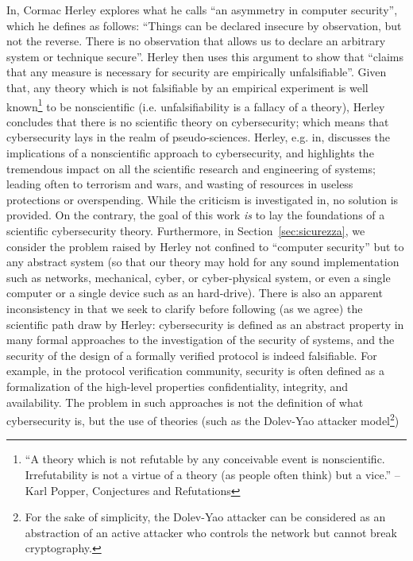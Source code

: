 \documentclass{article}
\theoremstyle{definition}
\theoremstyle{corollary}
\theoremstyle{lemma}
\theoremstyle{theorem}
\theoremstyle{theorem}
\begin{document}
In\autocite{Herley2016unfalsifiability}, Cormac Herley explores what he calls
``an asymmetry in computer security'', which he defines as follows: ``Things
can be declared insecure by observation, but not the reverse. There is no
observation that allows us to declare an arbitrary system or technique
secure''. Herley then uses this argument to show that ``claims that any measure
is necessary for security are empirically unfalsifiable''. Given that, any
theory which is not falsifiable by an empirical experiment is well
known\footnote{``A theory which is not refutable by any conceivable event is
nonscientific. Irrefutability is not a virtue of a theory (as people often
think) but a vice.'' -- Karl Popper, Conjectures and
Refutations\autocite{popper1962conjectures}} to be nonscientific (i.e.
unfalsifiability is a fallacy of a theory), Herley concludes that there is no
scientific theory on cybersecurity; which means that cybersecurity lays in the
realm of pseudo-sciences\autocite{Herley2016usenixvideo}.  Herley, e.g.
in\autocite{Herley2017justifying}, discusses the implications of a
nonscientific approach to cybersecurity, and highlights the tremendous impact on
all the scientific research and engineering of systems; leading often to
terrorism and wars, and wasting of resources in useless protections or
overspending.  While the criticism is investigated
in\autocite{Herley2016unfalsifiability}, no solution is provided.  On the
contrary, the goal of this work \emph{is} to lay the foundations of a
scientific cybersecurity theory. Furthermore, in Section~\ref{sec:sicurezza},
we consider the problem raised by Herley not confined to ``computer security''
but to any abstract system (so that our theory may hold for any sound
implementation such as networks, mechanical, cyber, or cyber-physical system,
or even a single computer or a single device such as an hard-drive).  There is
also an apparent inconsistency in\autocite{Herley2016unfalsifiability} that we
seek to clarify before following (as we agree) the scientific path draw by
Herley: cybersecurity is defined as an abstract property in many formal
approaches to the investigation of the security of systems, and the security of the design of a
formally verified protocol is indeed falsifiable.  For example, in the protocol
verification community, security is often defined as a formalization of the
high-level properties confidentiality, integrity, and availability. The problem
in such approaches is not the definition of what cybersecurity is, but the use
of theories (such as the Dolev-Yao attacker model\footnote{For the sake of
simplicity, the Dolev-Yao attacker can be considered as an abstraction of an
active attacker who controls the network but cannot break
cryptography.}\autocite{Dolev1983security})
\end{document}

